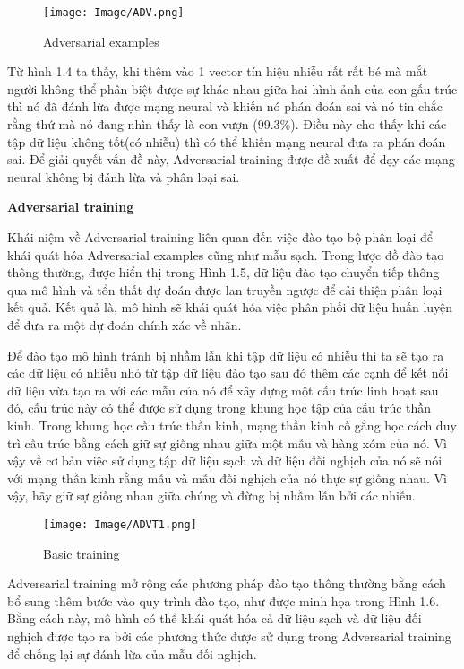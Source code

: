 \begin{figure}[h!]
    \centering
    \texttt{[image: Image/ADV.png]}
    \caption{Adversarial examples}
    \label{Hình 1.4: Adversarial examples}
    \cite*{Reference7}
\end{figure}

Từ hình 1.4 ta thấy, khi thêm vào 1 vector tín hiệu nhiễu rất rất bé mà mắt người không thể phân biệt được sự khác nhau giữa hai hình ảnh của con gấu trúc thì nó đã đánh lừa được mạng neural và khiến nó phán đoán sai và nó tin chắc rằng
thứ mà nó đang nhìn thấy là con vượn (99.3\%). Điều này cho thấy khi các tập dữ liệu không tốt(có nhiễu) thì có thể khiến mạng neural đưa ra phán đoán sai.
 Để giải quyết vấn đề này, Adversarial training được đề xuất để dạy các mạng neural không bị đánh lừa và phân loại sai. 

\textbf{Adversarial training}

Khái niệm về Adversarial training liên quan đến việc đào tạo bộ phân loại để khái quát hóa
Adversarial examples cũng như mẫu sạch. Trong lược đồ đào tạo thông thường, được hiển thị trong Hình 1.5, dữ liệu đào tạo chuyển tiếp
thông qua mô hình và tổn thất dự đoán được lan truyền ngược để cải thiện phân loại
kết quả. Kết quả là, mô hình sẽ khái quát hóa việc phân phối dữ liệu huấn luyện để
đưa ra một dự đoán chính xác về nhãn. 

Để đào tạo mô hình tránh bị nhầm lẫn khi tập dữ liệu có nhiễu thì ta sẽ tạo ra các dữ liệu có nhiễu nhỏ từ tập dữ liệu đào tạo
sau đó thêm các cạnh để kết nối dữ liệu vừa tạo ra với các mẫu của nó để xây dựng một cấu trúc linh hoạt sau đó, cấu trúc này có thể được sử dụng trong khung học tập
của cấu trúc thần kinh. Trong khung học cấu trúc thần kinh, mạng thần kinh cố gắng học cách duy trì cấu trúc bằng cách giữ sự giống nhau giữa một mẫu và hàng xóm của nó.
 Vì vậy về cơ bản việc sử dụng tập dữ liệu sạch và dữ liệu đối nghịch của nó sẽ nói với mạng thần kinh rằng mẫu và mẫu đối nghịch của nó thực sự giống nhau. Vì vậy, hãy giữ sự 
 giống nhau giữa chúng và đừng bị nhầm lẫn bởi các nhiễu.

\begin{figure}[h!]
    \centering
    \texttt{[image: Image/ADVT1.png]}
    \caption{Basic training}
    \label{Hình 1.5: Adversarial training}
    \cite*{Reference8}
\end{figure}

Adversarial training mở rộng các phương pháp đào tạo thông thường bằng cách bổ sung thêm
bước vào quy trình đào tạo, như được minh họa trong Hình 1.6. Bằng cách này, mô hình có thể
khái quát hóa cả dữ liệu sạch và dữ liệu đối nghịch được tạo ra bởi các phương thức
được sử dụng trong Adversarial training để chống lại sự đánh lừa của mẫu đối nghịch.

